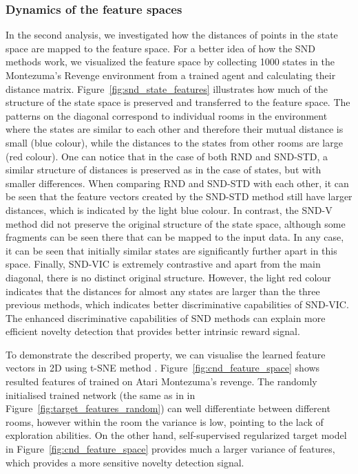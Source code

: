 \documentclass[a4paper,11pt]{elsarticle}
\begin{document}
\subsubsection{Dynamics of the feature spaces}

In the second analysis, we investigated how the distances of points in the state space are mapped to the feature space. For a better idea of how the SND methods work, we visualized the feature space by collecting 1000 states in the Montezuma's Revenge environment from a trained agent and calculating their distance matrix. Figure~\ref{fig:snd_state_features} illustrates how much of the structure of the state space is preserved and transferred to the feature space. The patterns on the diagonal correspond to individual rooms in the environment where the states are similar to each other and therefore their mutual distance is small (blue colour), while the distances to the states from other rooms are large (red colour). One can notice that in the case of both RND and SND-STD, a similar structure of distances is preserved as in the case of states, but with smaller differences. When comparing RND and SND-STD with each other, it can be seen that the feature vectors created by the SND-STD method still have larger distances, which is indicated by the light blue colour. In contrast, the SND-V method did not preserve the original structure of the state space, although some fragments can be seen there that can be mapped to the input data. In any case, it can be seen that initially similar states are significantly further apart in this space. Finally, SND-VIC is extremely contrastive and apart from the main diagonal, there is no distinct original structure. However, the light red colour indicates that the distances for almost any states are larger than the three previous methods, which indicates better discriminative capabilities of SND-VIC. The enhanced discriminative capabilities of SND methods can explain more efficient novelty detection that provides better intrinsic reward signal.

To demonstrate the described property, we can visualise the learned feature vectors  in 2D using t-SNE method \citep{tSNE2008}. Figure~\ref{fig:cnd_feature_space} shows resulted features of trained  on Atari Montezuma's revenge. The randomly initialised trained network (the same as in \cite{burda2018exploration} in Figure~\ref{fig:target_features_random}) can well differentiate between different rooms, however within the room the variance is low, pointing to the lack of exploration abilities. On the other hand, self-supervised regularized target model in Figure~\ref{fig:cnd_feature_space} provides much a larger variance of features, which provides a more sensitive novelty detection signal.
\end{document}
